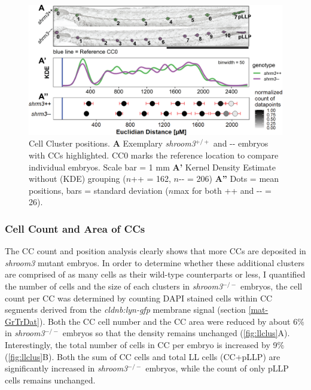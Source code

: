 \documentclass[11pt,singlespacinge,twoside]{reedthesis} %
\theoremstyle{definition}
\theoremstyle{definition}
\theoremstyle{definition}
\theoremstyle{remark}
\begin{document}
\begin{figure}

{\centering \includegraphics[width=0.85\linewidth]{figures/results/01_morphometrics/ll_positions} 

}

\caption[Cell Cluster Positions]{Cell Cluster positions. \textbf{A} Exemplary \emph{shroom3}\(^{+/+}\) and -\/- embryos with CCs highlighted. CC0 marks the reference location to compare individual embryos. Scale bar = 1 mm \textbf{A'} Kernel Density Estimate without (KDE) grouping (\(n\)++ = 162, \(n\)-\/- = 206) \textbf{A''} Dots = mean positions, bars = standard deviation (\(n\)max for both ++ and -\/- = 26).}\label{fig:llpos}
\end{figure}
\hypertarget{res-llmorph}{%
\subsubsection{Cell Count and Area of CCs}\label{res-llmorph}}

The CC count and position analysis clearly shows that more CCs are deposited in \emph{shroom3} mutant embryos. In order to determine whether these additional clusters are comprised of as many cells as their wild-type counterparts or less, I quantified the number of cells and the size of each clusters in \emph{shroom3}\(^{-/-}\) embryos, the cell count per CC was determined by counting DAPI stained cells within CC segments derived from the \emph{cldnb:lyn-gfp} membrane signal (section \ref{mat-GrTrDat}). Both the CC cell number and the CC area were reduced by about 6\(\%\) in \emph{shroom3}\(^{-/-}\) embryos so that the density remains unchanged (\ref{fig:llclus}A). Interestingly, the total number of cells in CC per embryo is increased by 9\(\%\) (\ref{fig:llclus}B). Both the sum of CC cells and total LL cells (CC+pLLP) are significantly increased in \emph{shroom3}\(^{-/-}\) embryos, while the count of only pLLP cells remains unchanged.
\end{document}
